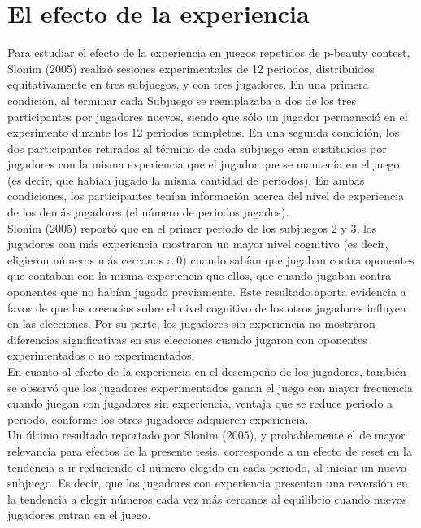 \section{El efecto de la experiencia}

Para estudiar el efecto de la experiencia en juegos repetidos de p-beauty contest, Slonim (2005) realizó sesiones experimentales de 12 periodos, distribuidos equitativamente en tres subjuegos, y con tres jugadores.
En una primera condición, al terminar cada Subjuego se reemplazaba a dos de los tres participantes por jugadores nuevos, siendo que sólo un jugador permaneció en el experimento durante los 12 periodos completos. En una segunda condición, los dos participantes retirados al término de cada subjuego eran sustituidos por jugadores con la misma experiencia que el jugador que se mantenía en el juego (es decir, que habían jugado la misma cantidad de periodos). En ambas condiciones, los participantes tenían información acerca del nivel de experiencia de los demás jugadores (el número de periodos jugados).\\

Slonim (2005) reportó que en el primer periodo de los subjuegos 2 y 3, los jugadores con más experiencia mostraron un mayor nivel cognitivo (es decir, eligieron números más cercanos a 0) cuando sabían que jugaban contra oponentes que contaban con la misma experiencia que ellos, que cuando jugaban contra oponentes que no habían jugado previamente. Este resultado aporta evidencia a favor de que las creencias sobre el nivel cognitivo de los otros jugadores influyen en las elecciones. Por su parte, los jugadores sin experiencia no mostraron diferencias signiﬁcativas en sus elecciones cuando jugaron con oponentes experimentados o no experimentados.\\

En cuanto al efecto de la experiencia en el desempeño de los jugadores, también se observó que los jugadores experimentados ganan el juego con mayor frecuencia cuando juegan con jugadores sin experiencia, ventaja que se reduce periodo a periodo, conforme los otros jugadores adquieren experiencia.\\

Un último resultado reportado por Slonim (2005), y probablemente el de mayor relevancia para efectos de la presente tesis, corresponde a un efecto de reset en la tendencia a ir reduciendo el número elegido en cada periodo, al iniciar un nuevo subjuego. Es decir, que los jugadores con experiencia presentan una reversión en la tendencia a elegir números cada vez más cercanos al equilibrio cuando nuevos jugadores entran en el juego.\\


